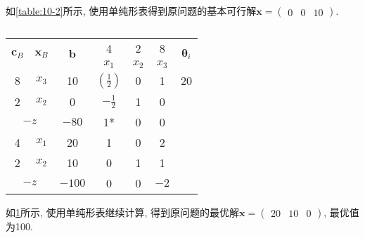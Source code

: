 如\cref{table:10-2}所示, 使用单纯形表得到原问题的基本可行解$\bm{x}=\begin{pmatrix}0 & 0 & 10\end{pmatrix}$.

\begin{table}[ht]
    \centering
    \caption{}
    \label{table:10-3}
    \begin{tabular}{|c|c|c|c|c|c|c|}
        \hline
        \multirow{2}{*}{$\bm{c}_B$} & \multirow{2}{*}{$\bm{x}_B$} & \multirow{2}{*}{$\bm{b}$} & \multicolumn{1}{c}{4} & \multicolumn{1}{c}{2} & 8 & \multirow{2}{*}{$\bm{\theta}_i$} \\
        \cline{4-6}
        &&& \multicolumn{1}{c}{$x_1$} & \multicolumn{1}{c}{$x_2$} & $x_3$ & \\
        \hline

        8 & {\color{red}$x_3$} & 10 & \multicolumn{1}{c}{\cellcolor{LightBlue1}\color{red}$\left(\tfrac{1}{2}\right)$} & \multicolumn{1}{c}{0} & 1 & {\color{red}20} \\
        \cline{1-3}
        2 & $x_2$ & 0 & \multicolumn{1}{c}{\cellcolor{LightBlue1}$-\tfrac{1}{2}$} & \multicolumn{1}{c}{1} & 0 & \\
        \hline
        \multicolumn{2}{|c|}{$-z$} & $-80$ & \multicolumn{1}{c}{\cellcolor{LightBlue1}\color{red}1*} & \multicolumn{1}{c}{0} & 0 & \\

        \hline

        4 & $x_1$ & 20 & \multicolumn{1}{c}{1} & \multicolumn{1}{c}{0} & 2 & \\
        \cline{1-3}
        2 & $x_2$ & 10 & \multicolumn{1}{c}{0} & \multicolumn{1}{c}{1} & 1 & \\
        \hline
        \multicolumn{2}{|c|}{$-z$} & $-100$ & \multicolumn{1}{c}{0} & \multicolumn{1}{c}{0} & $-2$ & \\

        \hline
    \end{tabular}
\end{table}
如\cref{table:10-3}所示, 使用单纯形表继续计算, 得到原问题的最优解$\bm{x}=\begin{pmatrix}20 & 10 & 0\end{pmatrix}$, 最优值为100.
